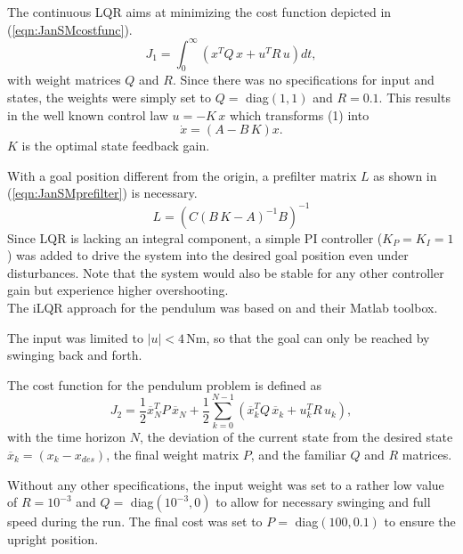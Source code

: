 \documentclass[letterpaper, 10 pt, conference]{ieeeconf}  %
\begin{document}
The continuous LQR aims at minimizing the cost function depicted in (\ref{eqn:JanSMcostfunc}).
\begin{equation}\label{eqn:JanSMcostfunc}
	J_1 = \int^{\infty}_{0} \left(x^{T}Q\,x + u^{T}R\,u\right)dt,
\end{equation}
with weight matrices $Q$ and $R$.
Since there was no specifications for input and states, the weights were simply set to $Q=$ diag$(1,1)$ and $R=0.1$. 
This results in the well known control law $u=-K\,x$ which transforms (1) into
\begin{equation}\label{eqn:JanSMcontrolledSys}
	\dot{x} = (A-B\,K)x.
\end{equation}
$K$ is the optimal state feedback gain.

With a goal position different from the origin, a prefilter matrix $L$ as shown in (\ref{eqn:JanSMprefilter}) is necessary.
\begin{equation}\label{eqn:JanSMprefilter}
L = \left(C(B\,K-A)^{-1}B\right)^{-1}
\end{equation}
Since LQR is lacking an integral component, a simple PI controller ($K_P=K_I=1$) was added to drive the system into the desired goal position even under disturbances. Note that the system would also be stable for any other controller gain but experience higher overshooting.\\

The iLQR approach for the pendulum was based on \cite{Opti_iLQR} and their Matlab toolbox. 


The input was limited to $|u|<4$\,Nm, so that the goal can only be reached by swinging back and forth. 

The cost function for the pendulum problem is defined as 
\begin{equation}\label{eqn:JanPcostfunc}
J_2 = \frac{1}{2}\overline{x}_N^{T}P\,\overline{x}_N + \frac{1}{2}\sum_{k=0}^{N-1}\left(\overline{x}_k^{T}Q\,\overline{x}_k + u_k^{T}R\,u_k\right),
\end{equation}
with the time horizon $N$, the deviation of the current state from the desired state $\overline{x}_k=(x_k-x_{des})$, the final weight matrix $P$, and the familiar $Q$ and $R$ matrices. 

Without any other specifications, the input weight was set to a rather low value of $R=10^{-3}$ and $Q=$ diag$(10^{-3},0)$ to allow for necessary swinging and full speed during the run. The final cost was set to $P=$ diag$(100,0.1)$ to ensure the upright position.
\end{document}
